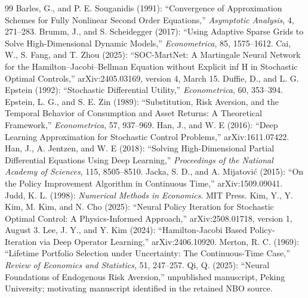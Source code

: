 \documentclass[ecta]{econsocart}
\theoremstyle{remark}
\begin{document}
\begin{thebibliography}{99}
 Barles, G., and P. E. Souganidis (1991): ``Convergence of Approximation Schemes for Fully Nonlinear Second Order Equations,'' \emph{Asymptotic Analysis}, 4, 271--283.
 Brumm, J., and S. Scheidegger (2017): ``Using Adaptive Sparse Grids to Solve High-Dimensional Dynamic Models,'' \emph{Econometrica}, 85, 1575--1612.
 Cai, W., S. Fang, and T. Zhou (2025): ``SOC-MartNet: A Martingale Neural Network for the Hamilton--Jacobi--Bellman Equation without Explicit inf H in Stochastic Optimal Controls,'' arXiv:2405.03169, version 4, March 15.
 Duffie, D., and L. G. Epstein (1992): ``Stochastic Differential Utility,'' \emph{Econometrica}, 60, 353--394.
 Epstein, L. G., and S. E. Zin (1989): ``Substitution, Risk Aversion, and the Temporal Behavior of Consumption and Asset Returns: A Theoretical Framework,'' \emph{Econometrica}, 57, 937--969.
 Han, J., and W. E (2016): ``Deep Learning Approximation for Stochastic Control Problems,'' arXiv:1611.07422.
 Han, J., A. Jentzen, and W. E (2018): ``Solving High-Dimensional Partial Differential Equations Using Deep Learning,'' \emph{Proceedings of the National Academy of Sciences}, 115, 8505--8510.
 Jacka, S. D., and A. Mijatovi\'c (2015): ``On the Policy Improvement Algorithm in Continuous Time,'' arXiv:1509.09041.
 Judd, K. L. (1998): \emph{Numerical Methods in Economics}. MIT Press.
 Kim, Y., Y. Kim, M. Kim, and N. Cho (2025): ``Neural Policy Iteration for Stochastic Optimal Control: A Physics-Informed Approach,'' arXiv:2508.01718, version 1, August 3.
 Lee, J. Y., and Y. Kim (2024): ``Hamilton-Jacobi Based Policy-Iteration via Deep Operator Learning,'' arXiv:2406.10920.
 Merton, R. C. (1969): ``Lifetime Portfolio Selection under Uncertainty: The Continuous-Time Case,'' \emph{Review of Economics and Statistics}, 51, 247--257.
 Qi, Q. (2025): ``Neural Foundations of Endogenous Risk Aversion,'' unpublished manuscript, Peking University; motivating manuscript identified in the retained NBO source.
\end{thebibliography}
\end{document}
